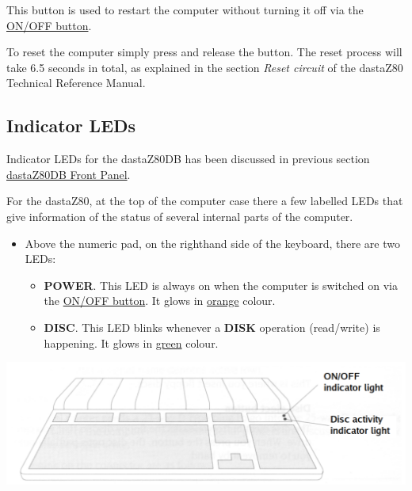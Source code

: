     This button is used to restart the computer without turning it off via the
    \hyperref[subsec:onoffbutt]{ON/OFF button}.

    To reset the computer simply press and release the button. The reset process
    will take 6.5 seconds in total, as explained in the section
    \textit{Reset circuit} of the dastaZ80 Technical Reference
    Manual\cite{dastaz80techman}.

    \subsection{Indicator LEDs}

    Indicator LEDs for the dastaZ80DB has been discussed in previous section
    \hyperref[subsec:frontpanel]{dastaZ80DB Front Panel}.

    For the dastaZ80, at the top of the computer case there a few labelled
    LEDs that give information of the  status of several internal parts of the
    computer.

    \begin{itemize}
        \item Above the numeric pad, on the righthand side of the keyboard,
        there are two LEDs:
        \begin{itemize}
            \item \textbf{POWER}. This LED is always on when the computer is
            switched on via the \hyperref[subsec:onoffbutt]{ON/OFF button}. It glows
            in \underline{orange} colour.
            \item \textbf{DISC}. This LED blinks whenever a \textbf{DISK} operation
            (read/write) is happening. It glows in \underline{green} colour.
        \end{itemize}
    \end{itemize}
    
    \centerline{\includegraphics[scale=0.5]{images/keyboardLEDs.png}}

